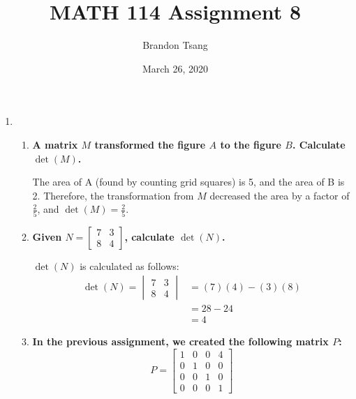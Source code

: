 \documentclass[11pt]{article}
\title{MATH 114 Assignment 8}
\author{Brandon Tsang}
\date{March 26, 2020}
\begin{document}
\maketitle
\begin{enumerate}[label=\textbf{\arabic*.}]
    \item{
          \begin{enumerate}[label=\textbf{(\alph*)}]
              \item{
                    \textbf{\boldmath A matrix $M$ transformed the figure $A$ to the figure $B$. Calculate $\det(M)$.}
                    \par
                    The area of A (found by counting grid squares) is 5, and the area of B is 2. Therefore, the transformation from $M$ decreased the area by a factor of $\frac{2}{5}$, and $\det(M)=\frac{2}{5}$.
                    }
              \item{
                    \textbf{\boldmath Given $N=\begin{bmatrix}7 & 3 \\ 8 & 4\end{bmatrix}$, calculate $\det(N)$.}
                    \par
                    $\det(N)$ is calculated as follows:
                    \begin{align*}
                        \det(N)=\begin{vmatrix}7 & 3 \\ 8 & 4\end{vmatrix} & =(7)(4)-(3)(8) \\
                                                          & =28-24         \\
                                                          & =4
                    \end{align*}
                    }
              \item{
                    \textbf{
                    \boldmath In the previous assignment, we created the following matrix $P$:
                    {\small
                    $$
                        P=
                        \begin{bmatrix}
                            1 & 0 & 0 & 4 \\
                            0 & 1 & 0 & 0 \\
                            0 & 0 & 1 & 0 \\
                            0 & 0 & 0 & 1
                        \end{bmatrix}
$$}}}
\end{enumerate}}
\end{enumerate}
\end{document}
